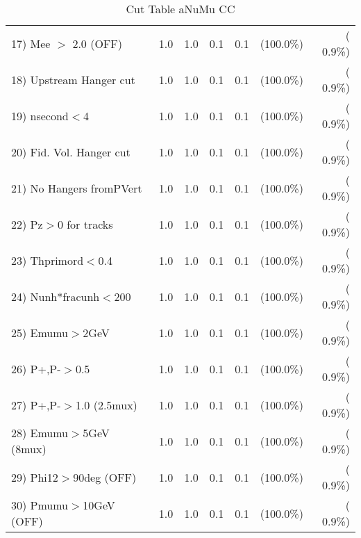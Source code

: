 \begin{table}[h!]
\begin{tabular}{||l||r|r|r|r|r|r||}
 17) Mee $>$ 2.0  (OFF)   &          1.0 &          1.0 &          0.1 &          0.1 & (100.0\%) & (  0.9\%) \\
 18) Upstream Hanger cut  &          1.0 &          1.0 &          0.1 &          0.1 & (100.0\%) & (  0.9\%) \\
 19) nsecond$<$4          &          1.0 &          1.0 &          0.1 &          0.1 & (100.0\%) & (  0.9\%) \\
 20) Fid. Vol. Hanger cut &          1.0 &          1.0 &          0.1 &          0.1 & (100.0\%) & (  0.9\%) \\
 21) No Hangers fromPVert &          1.0 &          1.0 &          0.1 &          0.1 & (100.0\%) & (  0.9\%) \\
 22) Pz$>$0 for tracks    &          1.0 &          1.0 &          0.1 &          0.1 & (100.0\%) & (  0.9\%) \\
 23) Thprimord$<$0.4      &          1.0 &          1.0 &          0.1 &          0.1 & (100.0\%) & (  0.9\%) \\
 24) Nunh*fracunh$<$200   &          1.0 &          1.0 &          0.1 &          0.1 & (100.0\%) & (  0.9\%) \\
 25) Emumu$>$2GeV         &          1.0 &          1.0 &          0.1 &          0.1 & (100.0\%) & (  0.9\%) \\
 26) P+,P-$>$0.5          &          1.0 &          1.0 &          0.1 &          0.1 & (100.0\%) & (  0.9\%) \\
 27) P+,P-$>$1.0 (2.5mux) &          1.0 &          1.0 &          0.1 &          0.1 & (100.0\%) & (  0.9\%) \\
 28) Emumu$>$5GeV  (8mux) &          1.0 &          1.0 &          0.1 &          0.1 & (100.0\%) & (  0.9\%) \\
 29) Phi12$>$90deg  (OFF) &          1.0 &          1.0 &          0.1 &          0.1 & (100.0\%) & (  0.9\%) \\
 30) Pmumu$>$10GeV  (OFF) &          1.0 &          1.0 &          0.1 &          0.1 & (100.0\%) & (  0.9\%) \\
 \hline
 \hline
 \end{tabular}
 \caption{Cut Table  aNuMu CC }
 \label{tab-cutcohjpsi-mumu_res}
 \end{table}
